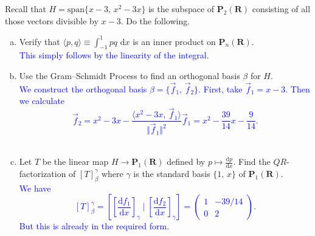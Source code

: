 \documentclass[a4paper,11pt]{article}
\newcommand{\R}{\mathbf{R}}
\newcommand{\PP}{\mathbf{P}}
\newcommand{\blue}[1]{\textcolor{blue}{#1}}
\begin{document}
 Recall that
$H=\text{span}\{x-3,\,x^2-3x\}$ is the subspace of $\PP_2(\R)$
consisting of all those vectors divisible by $x-3$. Do the following.
\begin{enumerate}[(a)]
\item Verify that $\langle p,q \rangle \equiv \int_{-1}^1pq\text{ d}x$ is an
  inner product on $\PP_n(\R)$. \\

  \blue{This simply follows by the linearity of the integral. \\}

\item Use the Gram--Schmidt Process to find an orthogonal basis $\beta$ for $H$.
  \\

  \blue{We construct the orthogonal basis $\beta=\{\vec f_1,\,\vec f_2\}$.
    First, take $\vec f_1=x-3$. Then we calculate
    \[
      \vec f_2 = x^2-3x - \frac{\langle x^2-3x,\,\vec f_1 \rangle}{\Vert \vec f_1 \Vert^2}\vec f_1 = x^2-\frac{39}{14}x-\frac{9}{14}.
    \] \\
  }

\item Let $T$ be the linear map $H \rightarrow \PP_1(\R)$ defined by $p
  \mapsto \frac{\text{d}p}{\text{d}x}$. Find the $QR$-factorization of
  $[T]_{\beta}^\gamma$ where $\gamma$ is the standard basis $\{1,\,x\}$ of
  $\PP_1(\R)$. \\

  \blue{We have
    \[
      [T]_\beta^\gamma = \left[ \left[ \frac{\text{d}f_1}{\text{d}x} \right]_\gamma
        \mid \left[ \frac{\text{d}f_2}{\text{d}x} \right]_\gamma \right] =
      \begin{pmatrix}
        1 & -39/14 \\
        0 & 2
      \end{pmatrix}.
    \]
    But this is already in the required form. \\}
\end{enumerate}
\end{document}
